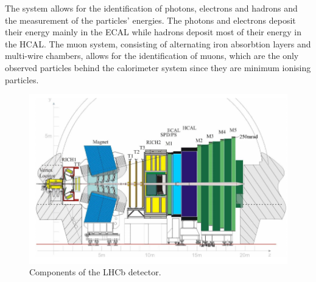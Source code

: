 The system allows for the identification of photons, electrons and hadrons and the measurement of the particles' energies. The photons and electrons
deposit their energy mainly in the ECAL while hadrons deposit most of their energy in the HCAL.
The muon system, consisting of alternating iron absorbtion layers and multi-wire chambers, allows for the identification of muons, which are
the only observed particles behind the calorimeter system since they are minimum ionising particles.

\begin{figure}[!htb]
    \centering
    \includegraphics[width=12cm]{graphics/lhcb.png}
    \caption{Components of the LHCb detector. \cite{sample_cpv}}
    \label{f1}
  \end{figure}



